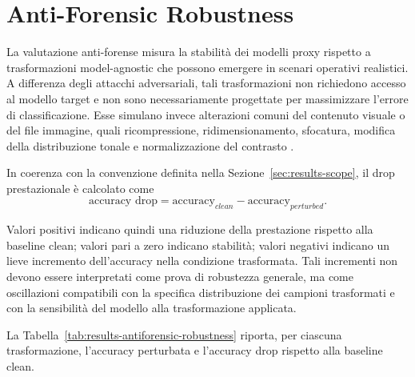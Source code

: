 \section{Anti-Forensic Robustness}
\label{sec:results-antiforensic}

La valutazione anti-forense misura la stabilità dei modelli proxy rispetto a
trasformazioni model-agnostic che possono emergere in scenari operativi
realistici. A differenza degli attacchi adversariali, tali trasformazioni non
richiedono accesso al modello target e non sono necessariamente progettate per
massimizzare l'errore di classificazione. Esse simulano invece alterazioni comuni
del contenuto visuale o del file immagine, quali ricompressione,
ridimensionamento, sfocatura, modifica della distribuzione tonale e
normalizzazione del contrasto
\cite{stamm2010anti,yaacoub2021digital,hendrycks2019benchmarking}.

In coerenza con la convenzione definita nella
Sezione~\ref{sec:results-scope}, il drop prestazionale è calcolato come
\[
\text{accuracy drop} =
\text{accuracy}_{clean} - \text{accuracy}_{perturbed}.
\]

Valori positivi indicano quindi una riduzione della prestazione rispetto alla
baseline clean; valori pari a zero indicano stabilità; valori negativi indicano
un lieve incremento dell'accuracy nella condizione trasformata. Tali incrementi
non devono essere interpretati come prova di robustezza generale, ma come
oscillazioni compatibili con la specifica distribuzione dei campioni trasformati
e con la sensibilità del modello alla trasformazione applicata.

La Tabella~\ref{tab:results-antiforensic-robustness} riporta, per ciascuna
trasformazione, l'accuracy perturbata e l'accuracy drop rispetto alla baseline
clean.

